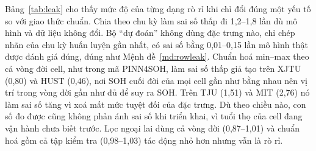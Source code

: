 Bảng~\ref{tab:leak} cho thấy mức độ của từng dạng rò rỉ khi chỉ đổi đúng một yếu tố so với giao thức chuẩn. Chia theo chu kỳ làm sai số thấp đi 1{,}2--1{,}8 lần dù mô hình và dữ liệu không đổi. Bộ “dự đoán” không dùng đặc trưng nào, chỉ chép nhãn của chu kỳ huấn luyện gần nhất, có sai số bằng 0{,}01--0{,}15 lần mô hình thật được đánh giá đúng, đúng như Mệnh đề~\ref{md:rowleak}. Chuẩn hoá min--max theo cả vòng đời cell, như trong mã PINN4SOH, làm sai số thấp giả tạo trên XJTU (0{,}80) và HUST (0{,}46), nơi SOH cuối đời của mọi cell gần như bằng nhau nên vị trí trong vòng đời gần như đủ để suy ra SOH. Trên TJU (1{,}51) và MIT (2{,}76) nó làm sai số tăng vì xoá mất mức tuyệt đối của đặc trưng. Dù theo chiều nào, con số đo được cũng không phản ánh sai số khi triển khai, vì tuổi thọ của cell đang vận hành chưa biết trước. Lọc ngoại lai dùng cả vòng đời (0{,}87--1{,}01) và chuẩn hoá gồm cả tập kiểm tra (0{,}98--1{,}03) tác động nhỏ hơn nhưng vẫn là rò rỉ.

